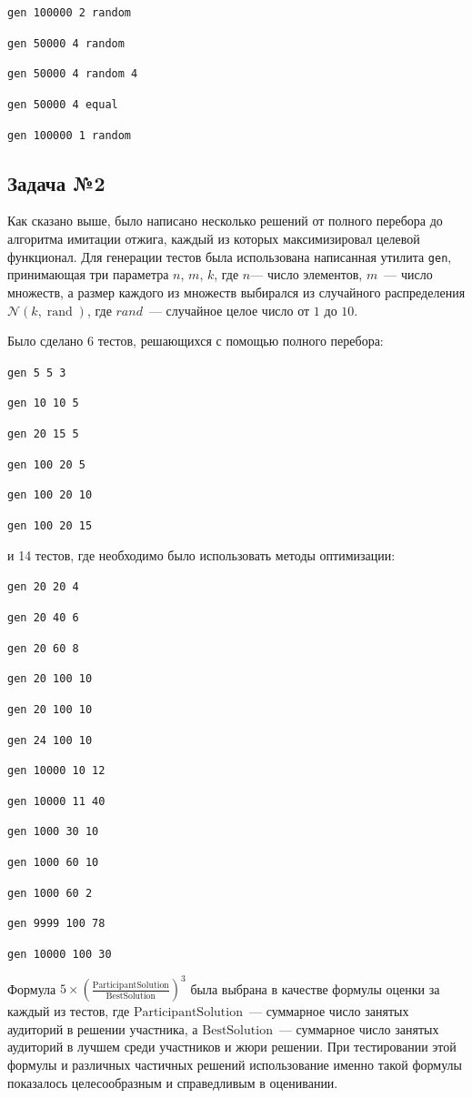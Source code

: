 \documentclass[a4paper]{article}
\begin{document}
\texttt{gen 100000 2 random }

\texttt{gen 50000 4 random }

\texttt{gen 50000 4 random 4 }

\texttt{gen 50000 4 equal }

\texttt{gen 100000 1 random }


\newpage

\subsection{Задача №2}

Как сказано выше, было написано несколько решений от полного перебора до алгоритма имитации отжига, каждый из которых максимизировал целевой функционал. Для генерации тестов была использована написанная утилита \texttt{gen}, принимающая три параметра $n$, $m$, $k$, где $n$--- число элементов, $m$~--- число множеств, а размер каждого из множеств выбирался из случайного распределения $\mathcal{N} (k, \operatorname{rand})$, где $rand$~--- случайное целое число от $1$ до $10$.

Было сделано 6 тестов, решающихся с помощью полного перебора:

\texttt{gen 5 5 3}

\texttt{gen 10 10 5}

\texttt{gen 20 15 5}

\texttt{gen 100 20 5}

\texttt{gen 100 20 10}

\texttt{gen 100 20 15}


и 14 тестов, где необходимо было использовать методы оптимизации:

\texttt{gen 20 20 4}

\texttt{gen 20 40 6}

\texttt{gen 20 60 8}

\texttt{gen 20 100 10}

\texttt{gen 20 100 10}

\texttt{gen 24 100 10}

\texttt{gen 10000 10 12}

\texttt{gen 10000 11 40}

\texttt{gen 1000 30 10}

\texttt{gen 1000 60 10}

\texttt{gen 1000 60 2}

\texttt{gen 9999 100 78}

\texttt{gen 10000 100 30}


Формула $5 \times\left(\frac{\text {ParticipantSolution}}{\text {BestSolution}}\right)^{3}$ была выбрана в качестве формулы оценки за каждый из тестов, где $\text{ParticipantSolution}$~--- суммарное число занятых аудиторий в решении участника, а $\text{BestSolution}$~--- суммарное число занятых аудиторий в лучшем среди участников и жюри решении. При тестировании этой формулы и различных частичных решений использование именно такой формулы показалось целесообразным и справедливым в оценивании.
\end{document}

